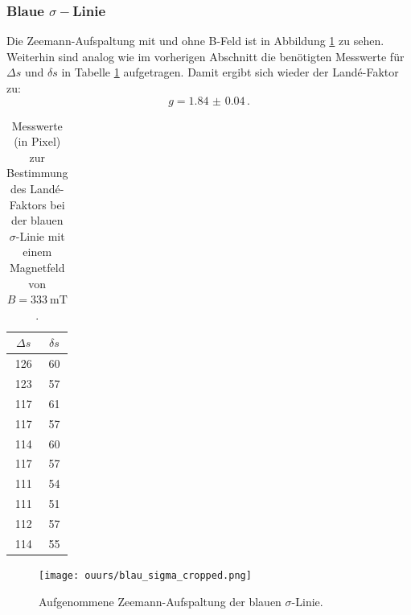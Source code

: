 \FloatBarrier
\subsubsection{Blaue \texorpdfstring{$\sigma-$}ALinie}
	Die Zeemann-Aufspaltung mit und ohne B-Feld ist in Abbildung \ref{fig:blau_sigma}
	zu sehen. Weiterhin sind analog wie im vorherigen Abschnitt die benötigten Messwerte
	für $\Delta s$ und $\delta s$ in Tabelle \ref{tab:blau_sigma} aufgetragen.
	Damit ergibt sich wieder der Landé-Faktor zu:
	\begin{equation*}
		g = \SI{1.84(4)} \, \text{.}
	\end{equation*}
	\begin{table}
		\centering
		\caption{Messwerte (in Pixel) zur Bestimmung des Landé-Faktors bei der blauen $\sigma$-Linie mit einem Magnetfeld von $B = \SI{333}{\milli\tesla}$.}
		\label{tab:blau_sigma}
		\begin{tabular}{c | c}
			\toprule
			$\Delta s$ & $\delta s$\\
			\midrule
			126 & 60 \\
			123 & 57 \\
			117 & 61 \\
			117 & 57 \\
			114 & 60 \\
			117 & 57 \\
			111 & 54 \\
			111 & 51 \\
			112 & 57 \\
			114 & 55 \\
			\bottomrule
		\end{tabular}
	\end{table}
	\begin{figure}
	\centering
	\texttt{[image: ouurs/blau\_sigma\_cropped.png]}
	\caption{Aufgenommene Zeemann-Aufspaltung der blauen $\sigma$-Linie.}
	\label{fig:blau_sigma}
\end{figure}

\FloatBarrier

